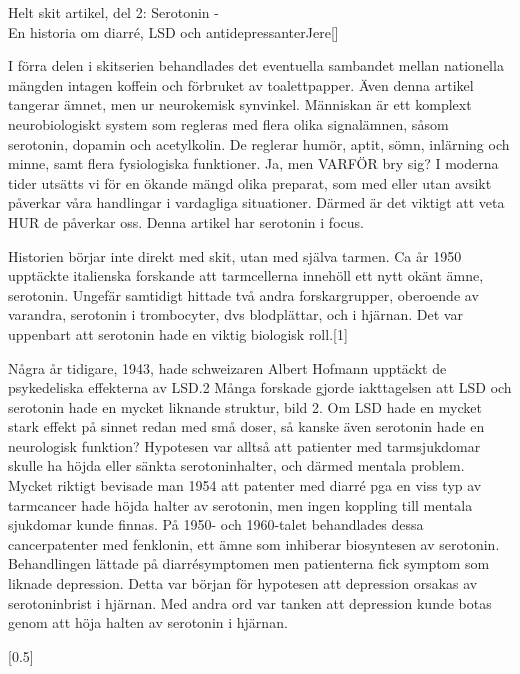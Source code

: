 \documentclass{spektraklet}
\begin{document}
\begin{artikel}{Helt skit artikel, del 2: Serotonin - \\ En historia om diarré, LSD och antidepressanter}{Jere}[]

I förra delen i skitserien behandlades det eventuella sambandet mellan nationella mängden intagen koffein och förbruket av toalettpapper. Även denna artikel tangerar ämnet, men ur neurokemisk synvinkel. Människan är ett komplext neurobiologiskt system som regleras med flera olika signalämnen, såsom serotonin, dopamin och acetylkolin. De reglerar humör, aptit, sömn, inlärning och minne, samt flera fysiologiska funktioner. Ja, men VARFÖR bry sig? I moderna tider utsätts vi för en ökande mängd olika preparat, som med eller utan avsikt påverkar våra handlingar i vardagliga situationer. Därmed är det viktigt att veta HUR de påverkar oss. Denna artikel har serotonin i focus.

Historien börjar inte direkt med skit, utan med själva tarmen. Ca år 1950 upptäckte italienska forskande att tarmcellerna innehöll ett nytt okänt ämne, serotonin. Ungefär samtidigt hittade två andra forskargrupper, oberoende av varandra, serotonin i trombocyter, dvs blodplättar, och i hjärnan. Det var uppenbart att serotonin hade en viktig biologisk roll.[1]

Några år tidigare, 1943, hade schweizaren Albert Hofmann upptäckt de psykedeliska effekterna av LSD.2 Många forskade gjorde iakttagelsen att LSD och serotonin hade en mycket liknande struktur, bild 2. Om LSD hade en mycket stark effekt på sinnet redan med små doser, så kanske även serotonin hade en neurologisk funktion? Hypotesen var alltså att patienter med tarmsjukdomar skulle ha höjda eller sänkta serotoninhalter, och därmed mentala problem. Mycket riktigt bevisade man 1954 att patenter med diarré pga en viss typ av tarmcancer hade höjda halter av serotonin, men ingen koppling till mentala sjukdomar kunde finnas. På 1950- och 1960-talet behandlades dessa cancerpatenter med fenklonin, ett ämne som inhiberar biosyntesen av serotonin. Behandlingen lättade på diarrésymptomen men patienterna fick symptom som liknade depression. Detta var början för hypotesen att depression orsakas av serotoninbrist i hjärnan. Med andra ord var tanken att depression kunde botas genom att höja halten av serotonin i hjärnan.


[0.5\columnwidth]


\end{artikel}
\end{document}
